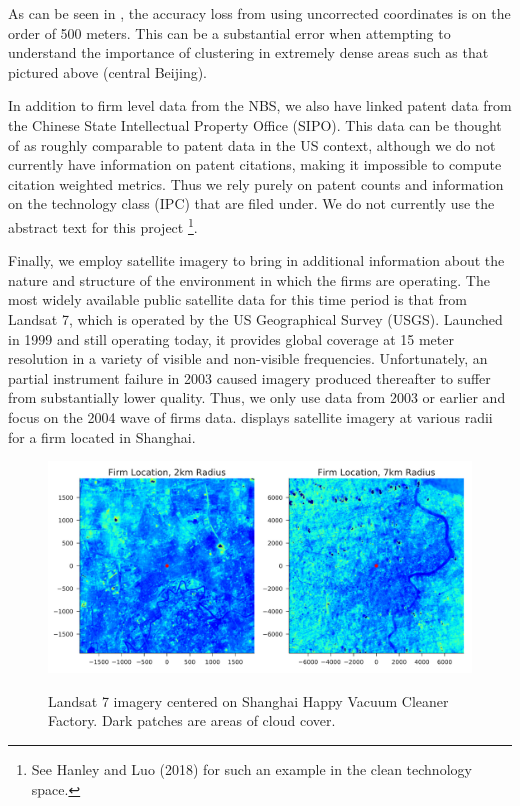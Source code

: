 \documentclass[12pt]{article}
\begin{document}
As can be seen in , the accuracy loss from using uncorrected coordinates is on the order of 500 meters. This can be a substantial error when attempting to understand the importance of clustering in extremely dense areas such as that pictured above (central Beijing).

In addition to firm level data from the NBS, we also have linked patent data from the Chinese State Intellectual Property Office (SIPO). This data can be thought of as roughly comparable to patent data in the US context, although we do not currently have information on patent citations, making it impossible to compute citation weighted metrics. Thus we rely purely on patent counts and information on the technology class (IPC) that are filed under. We do not currently use the abstract text for this project \footnote{See Hanley and Luo (2018) for such an example in the clean technology space.}.

Finally, we employ satellite imagery to bring in additional information about the nature and structure of the environment in which the firms are operating. The most widely available public satellite data for this time period is that from Landsat 7, which is operated by the US Geographical Survey (USGS). Launched in 1999 and still operating today, it provides global coverage at 15 meter resolution in a variety of visible and non-visible frequencies. Unfortunately, an partial instrument failure in 2003 caused imagery produced thereafter to suffer from substantially lower quality. Thus, we only use data from 2003 or earlier and focus on the 2004 wave of firms data.  displays satellite imagery at various radii for a firm located in Shanghai.

\begin{figure}
\begin{center}
\label{landsat_demo}
\includegraphics[width=\textwidth]{landsat_demo.pdf}

\caption{Landsat 7 imagery centered on Shanghai Happy Vacuum Cleaner Factory. Dark patches are areas of cloud cover.}
\end{center}
\end{figure}
\end{document}
